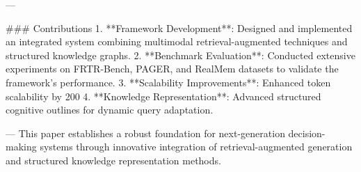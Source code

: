 ---

### Contributions  
1. **Framework Development**: Designed and implemented an integrated system combining multimodal retrieval-augmented techniques and structured knowledge graphs.  
2. **Benchmark Evaluation**: Conducted extensive experiments on FRTR-Bench, PAGER, and RealMem datasets to validate the framework's performance.  
3. **Scalability Improvements**: Enhanced token scalability by 200%
4. **Knowledge Representation**: Advanced structured cognitive outlines for dynamic query adaptation.  

---  
This paper establishes a robust foundation for next-generation decision-making systems through innovative integration of retrieval-augmented generation and structured knowledge representation methods.
